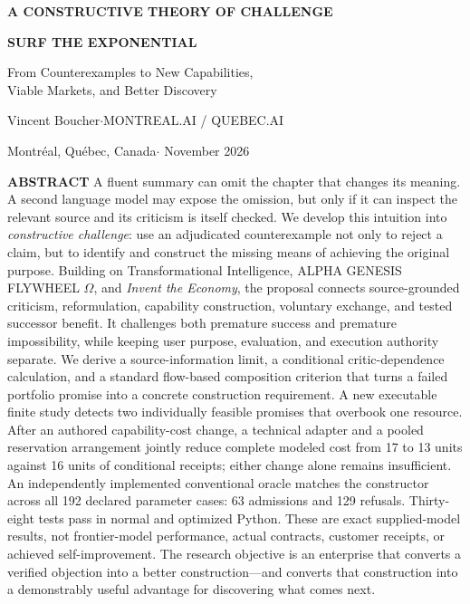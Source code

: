 \documentclass[11pt,a4paper]{article}
\newcommand{\eyebrow}[1]{{\sffamily\small\bfseries\color{Teal}\MakeUppercase{#1}}}
\newcommand{\genesis}{ALPHA GENESIS FLYWHEEL $\Omega$}
\newcommand{\ti}{Transformational Intelligence}
\begin{document}
\setcounter{page}{1}
\eyebrow{A constructive theory of challenge}
\begin{center}
{\sffamily\LARGE\bfseries\color{Plum}SURF THE EXPONENTIAL}\par
\vspace{4pt}
{\Large From Counterexamples to New Capabilities,\\Viable Markets, and Better Discovery}\par
\vspace{8pt}
Vincent Boucher\quad$\cdot$\quad MONTREAL.AI / QUEBEC.AI\par
{\small Montr\'eal, Qu\'ebec, Canada\quad$\cdot$ November 2026}
\end{center}
\eyebrow{Abstract}
A fluent summary can omit the chapter that changes its meaning. A second language model may expose the omission, but only if it can inspect the relevant source and its criticism is itself checked. We develop this intuition into \emph{constructive challenge}: use an adjudicated counterexample not only to reject a claim, but to identify and construct the missing means of achieving the original purpose. Building on \ti, \genesis, and \emph{Invent the Economy}, the proposal connects source-grounded criticism, reformulation, capability construction, voluntary exchange, and tested successor benefit. It challenges both premature success and premature impossibility, while keeping user purpose, evaluation, and execution authority separate. We derive a source-information limit, a conditional critic-dependence calculation, and a standard flow-based composition criterion that turns a failed portfolio promise into a concrete construction requirement. A new executable finite study detects two individually feasible promises that overbook one resource. After an authored capability-cost change, a technical adapter and a pooled reservation arrangement jointly reduce complete modeled cost from 17 to 13 units against 16 units of conditional receipts; either change alone remains insufficient. An independently implemented conventional oracle matches the constructor across all 192 declared parameter cases: 63 admissions and 129 refusals. Thirty-eight tests pass in normal and optimized Python. These are exact supplied-model results, not frontier-model performance, actual contracts, customer receipts, or achieved self-improvement. The research objective is an enterprise that converts a verified objection into a better construction---and converts that construction into a demonstrably useful advantage for discovering what comes next.
\end{document}
